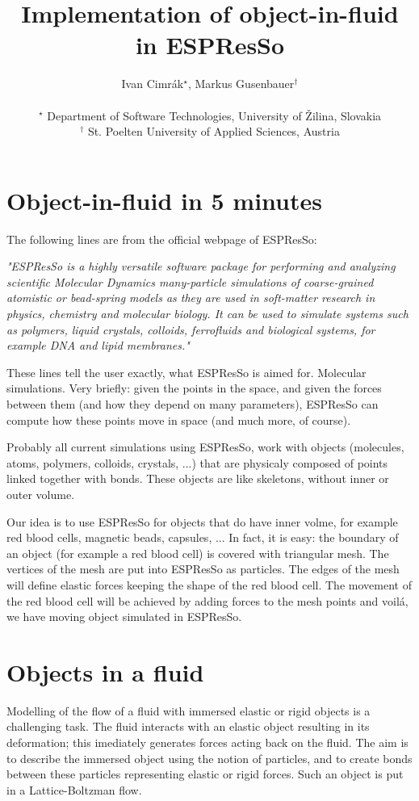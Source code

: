 \documentclass[a4paper]{article}
\title{Implementation of object-in-fluid in ESPResSo}
\author{Ivan Cimr\'ak$^\star$, Markus Gusenbauer$^\dagger$\\
\ \\
$^\star$ Department of Software Technologies, University of \v Zilina, Slovakia\\
$^\dagger$ St. Poelten University of Applied Sciences, Austria}
\date{}
\begin{document}
\maketitle
\section{Object-in-fluid in 5 minutes}
The following lines are from the official webpage of ESPResSo:
\begin{center}
\begin{minipage}{0.9\textwidth}
\emph{
"ESPResSo is a highly versatile software package for performing and analyzing scientific Molecular Dynamics many-particle simulations of coarse-grained atomistic or bead-spring models as they are used in soft-matter research in physics, chemistry and molecular biology. It can be used to simulate systems such as polymers, liquid crystals, colloids, ferrofluids and biological systems, for example DNA and lipid membranes."}
\end{minipage}
\end{center}
These lines tell the user exactly, what ESPResSo is aimed for. Molecular simulations. Very briefly: given the points in the space, and given the forces between them (and how they depend on many parameters), ESPResSo can compute how these points move in space (and much more, of course).

Probably all current simulations using ESPResSo, work with objects (molecules, atoms, polymers, colloids, crystals, ...) that are physicaly composed of points linked together with bonds. These objects are like skeletons, without inner or outer volume. 

Our idea is to use ESPResSo for objects that do have inner volme, for example red blood cells, magnetic beads, capsules, ... In fact, it is easy: the boundary of an object (for example a red blood cell) is covered with triangular mesh. The vertices of the mesh are put into ESPResSo as particles. The edges of the mesh will define elastic forces keeping the shape of the red blood cell. The movement of the red blood cell will be achieved by adding forces to the mesh points and voil\'a, we have moving object simulated in ESPResSo.

\section{Objects in a fluid}
Modelling of the flow of a fluid with immersed elastic or rigid objects is a challenging task. The fluid interacts with an elastic object resulting in its deformation; this imediately generates forces acting back on the fluid. The aim is to describe the immersed object using the notion of particles, and to create bonds between these particles representing elastic or rigid forces. Such an object is put in a Lattice-Boltzman flow.
\end{document}
